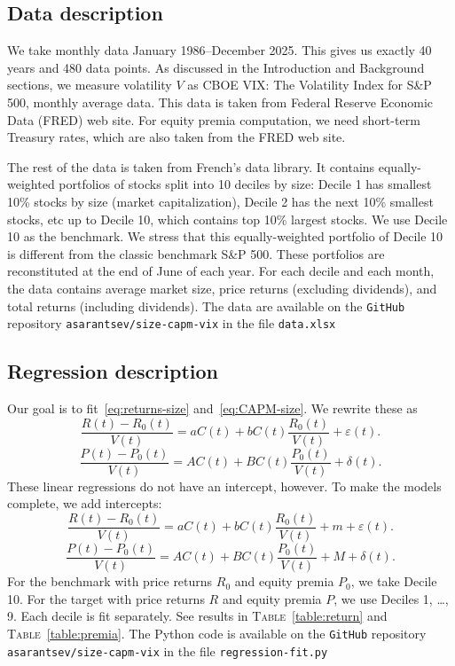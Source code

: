 \documentclass[12pt]{amsart}
\begin{document}
\subsection{Data description} We take monthly data January 1986--December 2025. This gives us exactly 40 years and 480 data points. As discussed in the Introduction and Background sections, we measure volatility $V$ as CBOE VIX: The Volatility Index for S\&P 500, monthly average data. This data is taken from Federal Reserve Economic Data (FRED) web site. For equity premia computation, we need short-term Treasury rates, which are also taken from the FRED web site. 

The rest of the data is taken from French's data library. It contains equally-weighted portfolios of stocks split into 10 deciles by size: Decile 1 has smallest 10\% stocks by size (market capitalization), Decile 2 has the next 10\% smallest stocks, etc up to Decile 10, which contains top 10\% largest stocks. We use Decile 10 as the benchmark. We stress that this equally-weighted portfolio of Decile 10 is different from the classic benchmark S\&P 500. These portfolios are reconstituted at the end of June of each year. For each decile and each month, the data contains average market size, price returns (excluding dividends), and total returns (including dividends). The data are available on the \texttt{GitHub} repository \texttt{asarantsev/size-capm-vix} in the file \texttt{data.xlsx}

\subsection{Regression description} Our goal is to fit~\eqref{eq:returns-size} and~\eqref{eq:CAPM-size}. We rewrite these as
$$
\frac{R(t) - R_0(t)}{V(t)} = aC(t) + bC(t)\frac{R_0(t)}{V(t)} + \varepsilon(t).
$$
$$
\frac{P(t) - P_0(t)}{V(t)} = AC(t) + BC(t)\frac{P_0(t)}{V(t)} + \delta(t).
$$
These linear regressions do not have an intercept, however. To make the models complete, we add intercepts:
\begin{equation}
\label{eq:returns-reg}
\frac{R(t) - R_0(t)}{V(t)} = aC(t) + bC(t)\frac{R_0(t)}{V(t)} + m + \varepsilon(t).
\end{equation}
\begin{equation}
\label{eq:premia-reg}
\frac{P(t) - P_0(t)}{V(t)} = AC(t) + BC(t)\frac{P_0(t)}{V(t)} + M + \delta(t).
\end{equation}
For the benchmark with price returns $R_0$ and equity premia $P_0$, we take Decile 10. For the target with price returns $R$ and equity premia $P$, we use Deciles 1, \ldots, 9. Each decile is fit separately. See results in \textsc{Table}~\ref{table:return} and  \textsc{Table}~\ref{table:premia}. The Python code is available on the \texttt{GitHub} repository \texttt{asarantsev/size-capm-vix} in the file \texttt{regression-fit.py}
\end{document}
